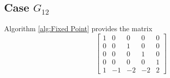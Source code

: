 \documentclass{article}
\theoremstyle{plain}
\theoremstyle{definition}
\newcommand{\tand}{\ensuremath{\,\,\, \text{and} \,\,\,}}
\begin{document}
\subsection{Case $G_{12}$}
Algorithm \ref{alg:Fixed Point} provides the matrix 
$$
 \left[ \begin {array}{ccccc} 1&0&0&0&0\\ 0&0&1&0&0
\\ 0&0&0&1&0\\ 0&0&0&0&1
\\ 1&-1&-2&-2&2\end {array} \right]
$$
\end{document}
